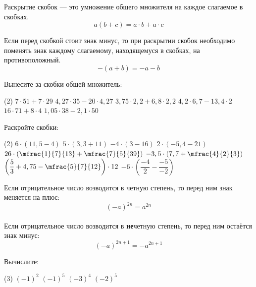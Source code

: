 %
%

\begin{class}[number=1-2]
	\begin{definit}
		Раскрытие скобок --- это умножение общего множителя на каждое слагаемое в скобках. \[ a(b+c) = a \cdot b + a \cdot c \]
	\end{definit}
	\begin{definit}
		Если перед скобкой стоит знак минус, то при раскрытии скобок необходимо поменять знак каждому слагаемому, находящемуся в скобках, на противоположный. \[ -(a+b) = -a-b \]
	\end{definit}
	\begin{listofex}
		\item Вынесите за скобки общей множитель: %
		\begin{tasks}(2)
			\task \( 7 \cdot 51 + 7 \cdot 29 \)
			\task \( 4,27 \cdot 35 - 20 \cdot 4,27 \)
			\task \( 3,75 \cdot 2,2 + 6,8 \cdot 2,2 \)
			\task \( 4,2 \cdot 6,7 - 13,4 \cdot 2 \)
			\task \( 16 \cdot 71 + 8 \cdot 4 \)
			\task \( 1,05 \cdot 38 - 2,1 \cdot 50 \)
		\end{tasks}
		\item Раскройте скобки:
		\begin{tasks}(2)
			\task \( 6 \cdot (11,5 - 4) \)
			\task \( 5 \cdot (3,3+11) \)
			\task \( -4 \cdot (3-16) \)
			\task \( 2 \cdot (-5,4-21) \)
			\task \( 26 \cdot \left( \mfrac{ 1 }{ 7 }{13}+\mfrac{ 7 }{5  }{39} \right) \)
			\task \( -3,5 \cdot \left( 7,7 + \mfrac{ 4 }{ 2 }{3} \right) \)
			\task \( \left( \dfrac{ 5 }{ 3 }+4,75 - \mfrac{ 5 }{ 7 }{12} \right) \cdot 12 \)
			\task \( -6 \cdot \left( \dfrac{ -4 }{ 2 }-\dfrac{ -5 }{ -2 } \right) \)
		\end{tasks}
	\end{listofex}
	\begin{definit}
		Если отрицательное число возводится в четную степень, то перед ним знак меняется на плюс: \[(-a)^{2n}=a^{2n}\] \\
		Если отрицательное число возводится в \textbf{не}четную степень, то перед ним остаётся знак минус: \[(-a)^{2n+1}=-a^{2n+1}\]
	\end{definit}
	\begin{listofex}[resume]
		\item Вычислите:
		\begin{tasks}(3)
			\task \( (-1)^2 \)
			\task \( (-1)^5 \)
			\task \( (-3)^4 \)
			\task \( (-2)^5 \)

\end{tasks}
\end{listofex}
\end{class}
